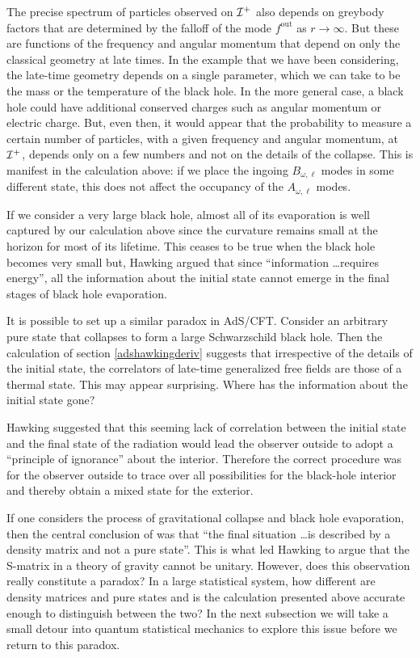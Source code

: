 \documentclass[12pt]{article}
\def\fout{f^{\text{out}}}
\def \scrip{{\cal I}^{+}}
\begin{document}
The precise spectrum of particles observed  on $\scrip$ also depends on greybody factors that are determined by the falloff of the mode $\fout$ as $r \rightarrow \infty$.  But these are functions of the frequency and angular momentum that depend on only the classical geometry at late times. In the example that we have been considering, the late-time geometry  depends on a single parameter, which we can take to be the mass or the temperature of the black hole. In
the more general case, a black hole could have additional conserved charges such as angular momentum or electric charge. But, even then, it would appear that the probability to measure a certain number of particles, with a given frequency and angular momentum, at $\scrip$, depends only on a few numbers and not on the details of the collapse.  This is manifest in the calculation above:  if we place the
ingoing $B_{\omega, \ell}$ modes in some different state, this does not affect the occupancy of the $A_{\omega,\ell}$ modes.

If we consider  a very large black hole, almost all of its evaporation is well captured by our calculation above since the curvature remains small at the horizon for most of its lifetime. This ceases to be true when the black hole
becomes very small but, Hawking argued that since ``information \ldots requires energy'', all the information about the initial state cannot emerge in the final stages of black hole evaporation.





It is possible to set up a similar paradox in AdS/CFT. Consider an arbitrary pure state that collapses to form a large Schwarzschild black hole.  Then the calculation of  section \ref{adshawkingderiv} suggests that irrespective of the details of the  initial state, the correlators of late-time generalized free fields are those of a thermal state. This may appear surprising. Where has the information about the initial state gone?

Hawking suggested that this seeming lack of correlation between the initial state and the final state of the radiation would lead the observer outside
to adopt a ``principle of ignorance'' about the interior. Therefore the correct procedure was
for the observer outside to trace over all possibilities for the black-hole interior and thereby obtain a mixed state for the exterior.



If one considers the process  of gravitational collapse and black hole evaporation, then the central conclusion of \cite{Hawking:1976ra} was that  ``the final situation \ldots is described by a density matrix and not a pure state''.  This is what led Hawking to argue that the S-matrix in a theory of gravity cannot be unitary.  However, does this observation really constitute a paradox?
In a large statistical system, how different are density matrices and pure states and is the calculation presented above accurate enough to distinguish between the two? In the next subsection we will take a small detour into quantum statistical mechanics to explore this issue before we return to this  paradox.
\end{document}
